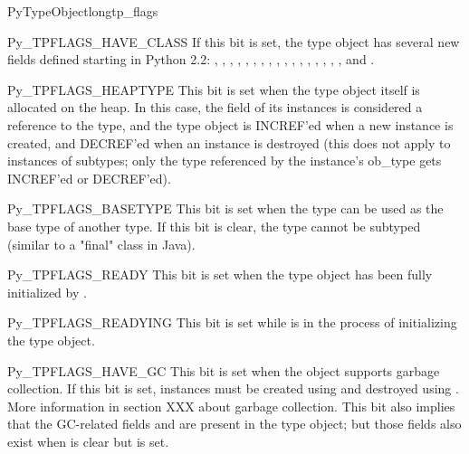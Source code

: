\begin{cmemberdesc}{PyTypeObject}{long}{tp_flags}
  \begin{datadesc}{Py_TPFLAGS_HAVE_CLASS}
    If this bit is set, the type object has several new fields defined
    starting in Python 2.2: , ,
    , , ,
    , ,
    , , ,
    , , ,
    , , ,
    , and .
  \end{datadesc}

  \begin{datadesc}{Py_TPFLAGS_HEAPTYPE}
    This bit is set when the type object itself is allocated on the
    heap.  In this case, the  field of its instances
    is considered a reference to the type, and the type object is
    INCREF'ed when a new instance is created, and DECREF'ed when an
    instance is destroyed (this does not apply to instances of
    subtypes; only the type referenced by the instance's ob_type gets
    INCREF'ed or DECREF'ed).
  \end{datadesc}

  \begin{datadesc}{Py_TPFLAGS_BASETYPE}
    This bit is set when the type can be used as the base type of
    another type.  If this bit is clear, the type cannot be subtyped
    (similar to a "final" class in Java).
  \end{datadesc}

  \begin{datadesc}{Py_TPFLAGS_READY}
    This bit is set when the type object has been fully initialized by
    .
  \end{datadesc}

  \begin{datadesc}{Py_TPFLAGS_READYING}
    This bit is set while  is in the process
    of initializing the type object.
  \end{datadesc}

  \begin{datadesc}{Py_TPFLAGS_HAVE_GC}
    This bit is set when the object supports garbage collection.  If
    this bit is set, instances must be created using
     and destroyed using
    .  More information in section XXX
    about garbage collection.  This bit also implies that the
    GC-related fields  and  are
    present in the type object; but those fields also exist when
     is clear but
     is set.
  \end{datadesc}


\end{cmemberdesc}
